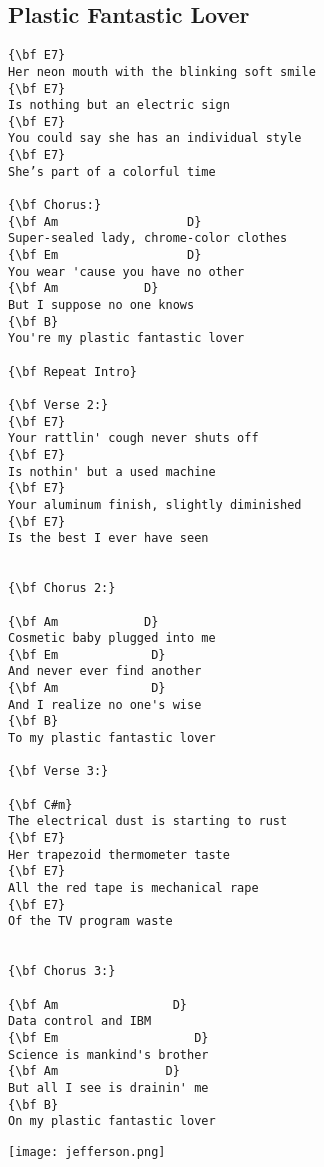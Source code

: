 \documentclass[a4paper]{article}
\begin{document}
\subsection{Plastic Fantastic Lover} %
\label{sub:Plastic Fantastic Lover}
\begin{multicols}{2}
\begin{Verbatim}[commandchars=\\\{\}]
{\bf E7}
Her neon mouth with the blinking soft smile
{\bf E7}
Is nothing but an electric sign
{\bf E7}
You could say she has an individual style
{\bf E7}
She’s part of a colorful time

{\bf Chorus:}
{\bf Am                  D}
Super-sealed lady, chrome-color clothes
{\bf Em                  D}
You wear 'cause you have no other
{\bf Am            D}
But I suppose no one knows
{\bf B}
You're my plastic fantastic lover

{\bf Repeat Intro}

{\bf Verse 2:}
{\bf E7}
Your rattlin' cough never shuts off
{\bf E7}
Is nothin' but a used machine
{\bf E7}
Your aluminum finish, slightly diminished
{\bf E7}
Is the best I ever have seen


{\bf Chorus 2:}

{\bf Am            D}
Cosmetic baby plugged into me
{\bf Em             D}
And never ever find another
{\bf Am             D}
And I realize no one's wise
{\bf B}
To my plastic fantastic lover

{\bf Verse 3:}

{\bf C#m}
The electrical dust is starting to rust
{\bf E7}
Her trapezoid thermometer taste
{\bf E7}
All the red tape is mechanical rape
{\bf E7}
Of the TV program waste


{\bf Chorus 3:}

{\bf Am                D}
Data control and IBM
{\bf Em                   D}
Science is mankind's brother
{\bf Am               D}
But all I see is drainin' me
{\bf B}
On my plastic fantastic lover
\end{Verbatim}
\end{multicols}
\newpage
\vspace{5cm}
\centerline{\texttt{[image: jefferson.png]}}
\newpage
\end{document}
